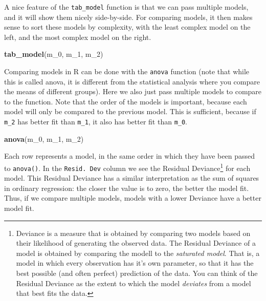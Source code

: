 \documentclass[
]{article}
\newenvironment{Shaded}{\begin{snugshade}}{\end{snugshade}}
\newcommand{\DecValTok}[1]{\textcolor[rgb]{0.00,0.00,0.81}{#1}}
\newcommand{\KeywordTok}[1]{\textcolor[rgb]{0.13,0.29,0.53}{\textbf{#1}}}
\newcommand{\NormalTok}[1]{#1}
\begin{document}
A nice feature of the \texttt{tab\_model} function is that we can pass
multiple models, and it will show them nicely side-by-side. For
comparing models, it then makes sense to sort these models by
complexity, with the least complex model on the left, and the most
complex model on the right.

\begin{Shaded}
\begin{Highlighting}[]
\KeywordTok{tab_model}\NormalTok{(m_}\DecValTok{0}\NormalTok{, m_}\DecValTok{1}\NormalTok{, m_}\DecValTok{2}\NormalTok{)}
\end{Highlighting}
\end{Shaded}

Comparing models in R can be done with the \texttt{anova} function (note
that while this is called anova, it is different from the statistical
analysis where you compare the means of different groups). Here we also
just pass multiple models to compare to the function. Note that the
order of the models is important, because each model will only be
compared to the previous model. This is sufficient, because if
\texttt{m\_2} has better fit than \texttt{m\_1}, it also has better fit
than \texttt{m\_0}.

\begin{Shaded}
\begin{Highlighting}[]
\KeywordTok{anova}\NormalTok{(m_}\DecValTok{0}\NormalTok{, m_}\DecValTok{1}\NormalTok{, m_}\DecValTok{2}\NormalTok{)}
\end{Highlighting}
\end{Shaded}

Each row represents a model, in the same order in which they have been
passed to \texttt{anova()}. In the \texttt{Resid.\ Dev} column we see
the Residual Deviance\footnote{Deviance is a measure that is obtained by
  comparing two models based on their likelihood of generating the
  observed data. The Residual Deviance of a model is obtained by
  comparing the modell to the \emph{saturated model}. That is, a model
  in which every observation has it's own parameter, so that it has the
  best possible (and often perfect) prediction of the data. You can
  think of the Residual Deviance as the extent to which the model
  \emph{deviates} from a model that best fits the data.} for each model.
This Residual Deviance has a similar interpretation as the sum of
squares in ordinary regression: the closer the value is to zero, the
better the model fit. Thus, if we compare multiple models, models with a
lower Deviance have a better model fit.
\end{document}
